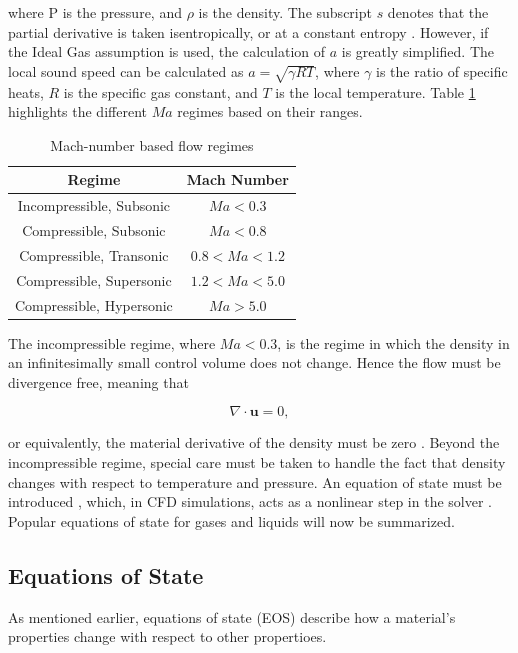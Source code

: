 \documentclass{UCF_ETD}
\begin{document}
where P is the pressure, and $\rho$ is the density. The subscript $s$ denotes that the partial derivative is taken isentropically, or at a constant entropy \cite{GasDynamics}. However, if the Ideal Gas assumption is used, the calculation of $a$ is greatly simplified. The local sound speed can be calculated as $a = \sqrt{\gamma R T}$, where $\gamma$ is the ratio of specific heats, $R$ is the specific gas constant, and $T$ is the local temperature. Table \ref{tab:mach_regimes} highlights the different $Ma$ regimes based on their ranges. 

\begin{table}[htp!]
    \centering
    \caption{Mach-number based flow regimes}
    \begin{tabular}{c|c}
       Regime  & Mach Number\\
       \hline
        Incompressible, Subsonic & $Ma < 0.3$ \\
        Compressible, Subsonic &  $Ma < 0.8 $\\
        Compressible, Transonic & $ 0.8 < Ma < 1.2$\\
        Compressible, Supersonic & $1.2 < Ma < 5.0$\\
        Compressible, Hypersonic & $ Ma > 5.0$
    \end{tabular}
    \label{tab:mach_regimes}
\end{table}

The incompressible regime, where $Ma < 0.3$, is the regime in which the density in an infinitesimally small control volume does not change. Hence the flow must be divergence free, meaning that

\begin{equation}
    \nabla \cdot \textbf{u} = 0,
\end{equation}

or equivalently, the material derivative of the density must be zero \cite{johnson2016handbook}.
Beyond the incompressible regime, special care must be taken to handle the fact that density changes with respect to temperature and pressure. An equation of state must be introduced \cite{GasDynamics}, which, in CFD simulations, acts as a nonlinear step in the solver \cite{Anderson1995}. Popular equations of state for gases and liquids will now be summarized.

\subsection{Equations of State}

As mentioned earlier, equations of state (EOS) describe how a material's properties change with respect to other propertioes.
\end{document}
